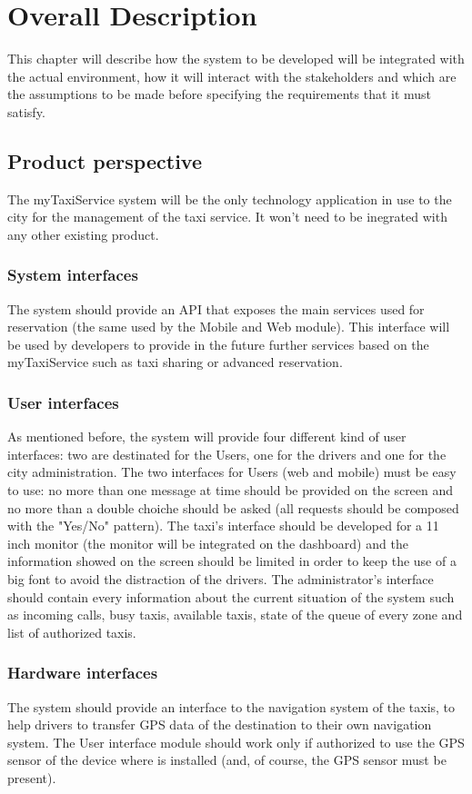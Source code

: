 \documentclass[12pt,a4paper]{book}
\begin{document}
	\chapter{Overall Description}
	This chapter will describe how the system to be developed will be integrated with the actual environment, how it will interact with the stakeholders and which are the assumptions to be made before specifying the requirements that it must satisfy.
		\section{Product perspective}
		The myTaxiService system will be the only technology application in use to the city for the management of the taxi service. It won't need to be inegrated with any other existing product.
			\subsection{System interfaces}
			The system should provide an API that exposes the main services used for reservation (the same used by the Mobile and Web module). This interface will be used by developers to provide in the future further services based on the myTaxiService such as taxi sharing or advanced reservation.
			\subsection{User interfaces}
			As mentioned before, the system will provide four different kind of user interfaces: two are destinated for the Users, one for the drivers and one for the city administration.
			The two interfaces for Users (web and mobile) must be easy to use: no more than one message at time should be provided on the screen and no more than a double choiche should be asked (all requests should be composed with the "Yes/No" pattern).
			The taxi's interface should be developed for a 11 inch monitor (the monitor will be integrated on the dashboard) and the information showed on the screen should be limited in order to keep the use of a big font to avoid the distraction of the drivers.
			The administrator's interface should contain every information about the current situation of the system such as incoming calls, busy taxis, available taxis, state of the queue of every zone and list of authorized taxis.
			\subsection{Hardware interfaces}
			The system should provide an interface to the navigation system of the taxis, to help drivers to transfer GPS data of the destination to their own navigation system.
			The User interface module should work only if authorized to use the GPS sensor of the device where is installed (and, of course, the GPS sensor must be present).
\end{document}
